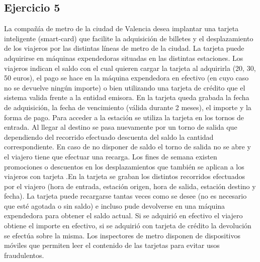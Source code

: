 \documentclass[12pt,letterpaper]{article}
\begin{document}
\subsection{\textbf{Ejercicio 5}}
La compañía de metro de la ciudad de Valencia desea implantar una tarjeta inteligente (smart‐card) que facilite la adquisición de billetes y el desplazamiento de los viajeros por las distintas líneas de metro de la ciudad. La tarjeta puede adquirirse en máquinas expendedoras situadas en las distintas estaciones. Los viajeros indican el saldo con el cual quieren cargar la tarjeta al adquirirla (20, 30, 50 euros), el pago se hace en la máquina expendedora en efectivo (en cuyo caso no se devuelve ningún importe) o bien utilizando una tarjeta de crédito que el sistema valida frente a la entidad emisora. En la tarjeta queda grabada la fecha de adquisición, la fecha de vencimiento (válida durante 2 meses), el importe y la forma de pago. Para acceder a la estación se utiliza la tarjeta en los tornos de entrada. Al llegar al destino se pasa nuevamente por un torno de salida que dependiendo del recorrido efectuado descuenta del saldo la cantidad correspondiente. En caso de no disponer de saldo el torno de salida no se abre y el viajero tiene que efectuar una recarga. Los fines de semana existen promociones o descuentos en los desplazamientos que también se aplican a los viajeros con tarjeta .En la tarjeta se graban los distintos recorridos efectuados por el viajero (hora de entrada, estación origen, hora de salida, estación destino y fecha). La tarjeta puede recargarse tantas veces como se desee (no es necesario que esté agotada o sin saldo) e incluso pude devolverse en una máquina expendedora para obtener el saldo actual. Si se adquirió en efectivo el viajero obtiene el importe en efectivo, si se adquirió con tarjeta de crédito la devolución se efectúa sobre la misma. Los inspectores de metro disponen de dispositivos móviles que permiten leer el contenido de las tarjetas para evitar usos fraudulentos.
\end{document}
